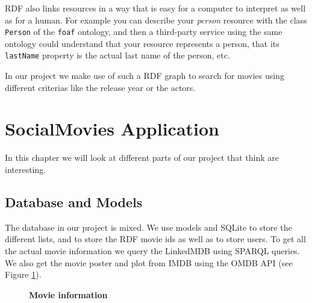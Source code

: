 \documentclass[12pt,a4paper]{article}
\begin{document}
RDF also links resources in a way that is easy for a computer to interpret as well as for a human. For example you can describe your \textit{person} resource with the class \texttt{Person} of the \texttt{foaf} ontology, and then a third-party service using the same ontology could understand that your resource represents a person, that its \texttt{lastName} property is the actual last name of the person, etc.

In our project we make use of such a RDF graph to search for movies using different criterias like the release year or the actors.

\section{SocialMovies Application}\label{app}

In this chapter we will look at different parts of our project that think are interesting.

\subsection{Database and Models}
The database in our project is mixed. We use models and SQLite to store the different lists, and to store the RDF movie ids as well as to store users. To get all the actual movie information we query the LinkedMDB using SPARQL queries. We also get the movie poster and plot from IMDB using the OMDB API (see Figure \ref{movie_info}).

\begin{figure}[h]
\begin{center}
\end{center}
\caption{\textbf{Movie information}}
\label{movie_info}
\end{figure}
\end{document}
